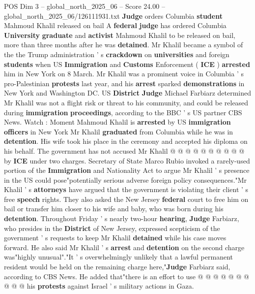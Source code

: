 \begin{textsample}{POS Dim 3 – global\_north\_2025\_06 – Score 24.00 – global\_north\_2025\_06/126111931.txt}  \label{ex:f3_pos_100}
\textbf{Judge} orders Columbia \textbf{student} Mahmoud Khalil released on bail A \textbf{federal} \textbf{judge} has ordered Columbia \textbf{University} \textbf{graduate} and \textbf{activist} Mahmoud Khalil to be released on bail, more than three months after he was \textbf{detained}.
Mr Khalil became a symbol of the the Trump administration ' s \textbf{crackdown} on \textbf{universities} and foreign \textbf{students} when US \textbf{Immigration} and \textbf{Customs} Enforcement ( \textbf{ICE} ) \textbf{arrested} him in New York on 8 March.
Mr Khalil was a prominent voice in Columbia ' s pro-Palestinian \textbf{protests} last year, and his \textbf{arrest} sparked \textbf{demonstrations} in New York and Washington DC.
US \textbf{District} \textbf{Judge} Michael Farbiarz determined Mr Khalil was not a flight risk or threat to his community, and could be released during \textbf{immigration} \textbf{proceedings}, according to the BBC ' s US partner CBS News.
Watch : Moment Mahmoud Khalil is \textbf{arrested} by US \textbf{immigration} \textbf{officers} in New York Mr Khalil \textbf{graduated} from Columbia while he was in \textbf{detention}.
His wife took his place in the ceremony and accepted his diploma on his behalf.
The government has not accused Mr Khalil @ @ @ @ @ @ @ @ @ @ by \textbf{ICE} under two charges.
Secretary of State Marco Rubio invoked a rarely-used portion of the \textbf{Immigration} and Nationality Act to argue Mr Khalil ' s presence in the US could pose"potentially serious adverse foreign policy consequences."Mr Khalil ' s \textbf{attorneys} have argued that the government is violating their client ' s free \textbf{speech} rights.
They also asked the New Jersey \textbf{federal} court to free him on bail or transfer him closer to his wife and baby, who was born during his \textbf{detention}.
Throughout Friday ' s nearly two-hour \textbf{hearing}, \textbf{Judge} Farbiarz, who presides in the \textbf{District} of New Jersey, expressed scepticism of the government ' s requests to keep Mr Khalil \textbf{detained} while his case moves forward.
He also said Mr Khalil ' s \textbf{arrest} and \textbf{detention} on the second charge was"highly unusual"."It ' s overwhelmingly unlikely that a lawful permanent resident would be held on the remaining charge here,"\textbf{Judge} Farbiarz said, according to CBS News.
He added that"there is an effort to use @ @ @ @ @ @ @ @ @ @ his \textbf{protests} against Israel ' s military actions in Gaza.

\end{textsample}
